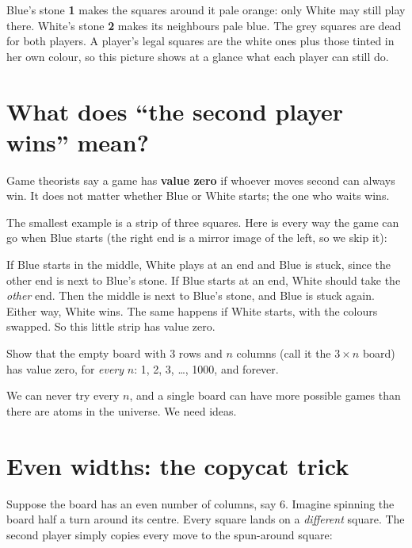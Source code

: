 \documentclass[11pt]{article}
\begin{document}
Blue's stone \textbf{1} makes the squares around it pale orange: only White
may still play there. White's stone \textbf{2} makes its neighbours pale
blue. The grey squares are dead for both players. A player's legal squares
are the white ones plus those tinted in her own colour, so this picture shows
at a glance what each player can still do.

\section{What does ``the second player wins'' mean?}

Game theorists say a game has \textbf{value zero} if whoever moves second can
always win. It does not matter whether Blue or White starts; the one who waits
wins.

The smallest example is a strip of three squares. Here is every way the game
can go when Blue starts (the right end is a mirror image of the left, so we
skip it):

\begin{center}
\end{center}

If Blue starts in the middle, White plays at an end and Blue is stuck, since
the other end is next to Blue's stone. If Blue starts at an end, White should
take the \emph{other} end. Then the middle is next to Blue's stone, and Blue is
stuck again. Either way, White wins. The same happens if White starts, with
the colours swapped. So this little strip has value zero.

\begin{idea}
Show that the empty board with 3 rows and $n$ columns (call it the
$3\times n$ board) has value zero, for \emph{every} $n$: 1, 2, 3, \dots,
1000, and forever.
\end{idea}

We can never try every $n$, and a single board can have more possible games
than there are atoms in the universe. We need ideas.

\section{Even widths: the copycat trick}

Suppose the board has an even number of columns, say 6. Imagine spinning the
board half a turn around its centre. Every square lands on a \emph{different}
square. The second player simply copies every move to the spun-around square:
\end{document}
